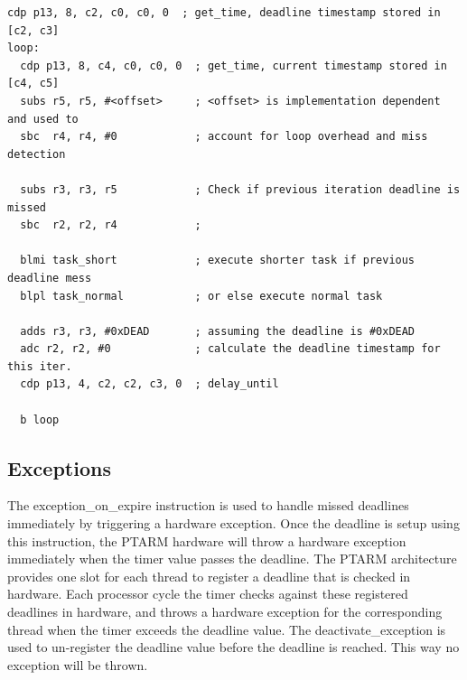 \begin{lstlisting}[float=h, label=lst:timed_loop_compensate,caption=Timed loops with compensation ]
  cdp p13, 8, c2, c0, c0, 0  ; get_time, deadline timestamp stored in [c2, c3]
loop:
  cdp p13, 8, c4, c0, c0, 0  ; get_time, current timestamp stored in [c4, c5]
  subs r5, r5, #<offset>     ; <offset> is implementation dependent and used to 
  sbc  r4, r4, #0            ; account for loop overhead and miss detection

  subs r3, r3, r5            ; Check if previous iteration deadline is missed
  sbc  r2, r2, r4            ; 

  blmi task_short            ; execute shorter task if previous deadline mess 
  blpl task_normal           ; or else execute normal task 
  
  adds r3, r3, #0xDEAD       ; assuming the deadline is #0xDEAD
  adc r2, r2, #0             ; calculate the deadline timestamp for this iter.
  cdp p13, 4, c2, c2, c3, 0  ; delay_until
   
  b loop
\end{lstlisting}


\subsection{Exceptions}
The exception\_on\_expire instruction is used to handle missed deadlines immediately by triggering a hardware exception. 
Once the deadline is setup using this instruction, the PTARM hardware will throw a hardware exception immediately when the timer value passes the deadline.
The PTARM architecture provides one slot for each thread to register a deadline that is checked in hardware.
Each processor cycle the timer checks against these registered deadlines in hardware, and throws a hardware exception for the corresponding thread when the timer exceeds the deadline value. 
The deactivate\_exception is used to un-register the deadline value before the deadline is reached. 
This way no exception will be thrown.

